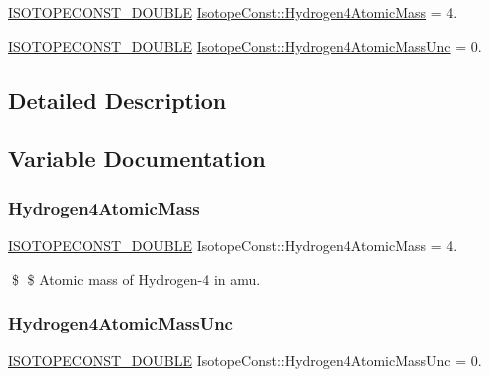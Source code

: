 \begin{DoxyCompactItemize}
\item 
\mbox{\hyperlink{group___isotope_const-_macros_ga8f45a7272ce02c0b4c65c44636ed719a}{I\+S\+O\+T\+O\+P\+E\+C\+O\+N\+S\+T\+\_\+\+D\+O\+U\+B\+LE}} \mbox{\hyperlink{group___isotope_const-_hydrogen-_h4_ga2cdf97b32a27b7afc1d72092562b517b}{Isotope\+Const\+::\+Hydrogen4\+Atomic\+Mass}} = 4.
\item 
\mbox{\hyperlink{group___isotope_const-_macros_ga8f45a7272ce02c0b4c65c44636ed719a}{I\+S\+O\+T\+O\+P\+E\+C\+O\+N\+S\+T\+\_\+\+D\+O\+U\+B\+LE}} \mbox{\hyperlink{group___isotope_const-_hydrogen-_h4_gaac3246797903a562e97d7addc1a2e3c0}{Isotope\+Const\+::\+Hydrogen4\+Atomic\+Mass\+Unc}} = 0.
\end{DoxyCompactItemize}


\subsection{Detailed Description}


\subsection{Variable Documentation}
\mbox{\label{group___isotope_const-_hydrogen-_h4_ga2cdf97b32a27b7afc1d72092562b517b}} 
\subsubsection{\texorpdfstring{Hydrogen4\+Atomic\+Mass}{Hydrogen4AtomicMass}}
{\footnotesize\ttfamily \mbox{\hyperlink{group___isotope_const-_macros_ga8f45a7272ce02c0b4c65c44636ed719a}{I\+S\+O\+T\+O\+P\+E\+C\+O\+N\+S\+T\+\_\+\+D\+O\+U\+B\+LE}} Isotope\+Const\+::\+Hydrogen4\+Atomic\+Mass = 4.}

\$ \$ Atomic mass of Hydrogen-\/4 in amu. \mbox{\label{group___isotope_const-_hydrogen-_h4_gaac3246797903a562e97d7addc1a2e3c0}} 
\subsubsection{\texorpdfstring{Hydrogen4\+Atomic\+Mass\+Unc}{Hydrogen4AtomicMassUnc}}
{\footnotesize\ttfamily \mbox{\hyperlink{group___isotope_const-_macros_ga8f45a7272ce02c0b4c65c44636ed719a}{I\+S\+O\+T\+O\+P\+E\+C\+O\+N\+S\+T\+\_\+\+D\+O\+U\+B\+LE}} Isotope\+Const\+::\+Hydrogen4\+Atomic\+Mass\+Unc = 0.}


